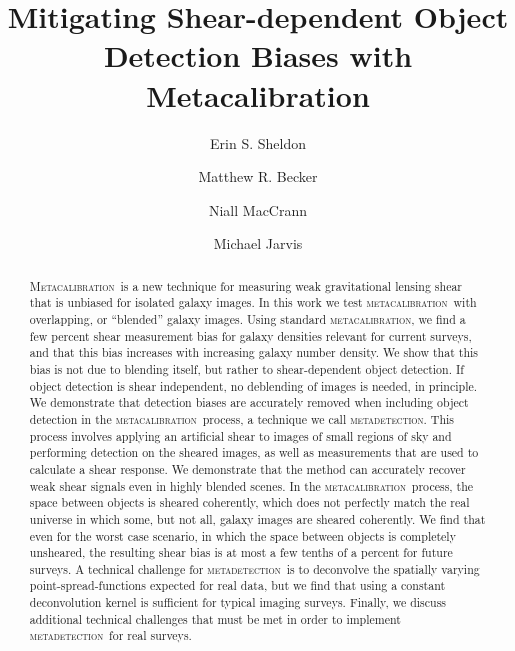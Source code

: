 \documentclass[draft, iop, twocolappendix, appendixfloats, numberedappendix, apj]{hackemulateapj}
\newcommand{\mcal}{\textsc{metacalibration}}
\newcommand{\mdet}{\textsc{metadetection}}
\newcommand{\Mcal}{\textsc{Metacalibration}}
\newcommand{\Mdet}{\textsc{Metadetection}}
\begin{document}


\title{Mitigating Shear-dependent Object Detection Biases with Metacalibration}

\author{Erin S. Sheldon}
\author{Matthew R. Becker}
\author{Niall MacCrann}
\author{Michael Jarvis}


\begin{abstract}

    \Mcal\ is a new technique for measuring weak gravitational lensing shear
    that is unbiased for isolated galaxy images.  In this work we test \mcal\
    with overlapping, or ``blended'' galaxy images.  Using standard \mcal, we
    find a few percent shear measurement bias for galaxy densities relevant for
    current surveys, and that this bias increases with increasing galaxy number
    density.  We show that this bias is not due to blending itself, but rather
    to shear-dependent object detection. If object detection is shear
    independent, no deblending of images is needed, in principle.  We
    demonstrate that detection biases are accurately removed when including
    object detection in the \mcal\ process, a technique we call \mdet.  This
    process involves applying an artificial shear to images of small regions of
    sky and performing detection on the sheared images, as well as measurements
    that are used to calculate a shear response.   We demonstrate that the
    method can accurately recover weak shear signals even in highly blended
    scenes.  In the \mcal\ process, the space between objects is sheared
    coherently, which does not perfectly match the real universe in which some,
    but not all, galaxy images are sheared coherently.  We find that even for
    the worst case scenario, in which the space between objects is completely
    unsheared, the resulting shear bias is at most a few tenths of a percent
    for future surveys.  A technical challenge for \mdet\ is to deconvolve the
    spatially varying point-spread-functions expected for real data, but we
    find that using a constant deconvolution kernel is sufficient for typical
    imaging surveys.  Finally, we discuss additional technical challenges that
    must be met in order to implement \mdet\ for real surveys.

\end{abstract}
\end{document}
